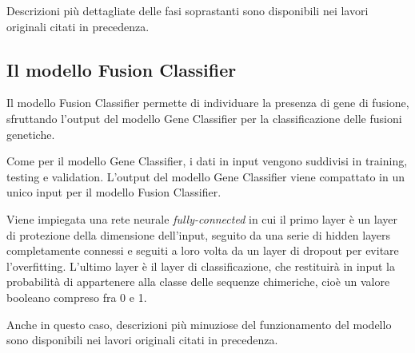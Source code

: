 Descrizioni più dettagliate delle fasi soprastanti sono disponibili nei lavori originali citati in precedenza.

\subsection{Il modello Fusion Classifier}

Il modello Fusion Classifier permette di individuare la presenza di gene di fusione, sfruttando l'output del modello Gene Classifier per la classificazione delle fusioni genetiche.

Come per il modello Gene Classifier, i dati in input vengono suddivisi in training, testing e validation. L'output del modello Gene Classifier viene compattato in un unico input per il modello Fusion Classifier.

Viene impiegata una rete neurale {\em fully-connected} in cui il primo layer è un layer di protezione della dimensione dell'input, seguito da una serie di hidden layers completamente connessi e seguiti a loro volta da un layer di dropout per evitare l'overfitting. L'ultimo layer è il layer di classificazione, che restituirà in input la probabilità di appartenere alla classe delle sequenze chimeriche, cioè un valore booleano compreso fra 0 e 1.

Anche in questo caso, descrizioni più minuziose del funzionamento del modello sono disponibili nei lavori originali citati in precedenza.